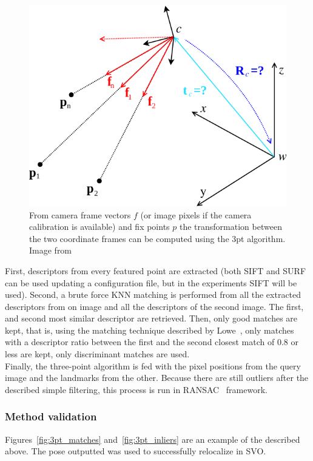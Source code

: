 \begin{figure}[htpb]
  \centering
  \includegraphics[width=0.6\linewidth]{img/absolute_central.png}
  \caption{From camera frame vectors $f$ (or image pixels if the camera calibration is available) and fix points $p$ the transformation between the two coordinate frames can be computed using the 3pt algorithm. Image from \cite{kneipopengv}}
  \label{fig:img/absolute_centra}
\end{figure}

First, descriptors from every featured point are extracted (both SIFT and SURF can be used updating a configuration file, but in the experiments SIFT will be used). Second, a brute force KNN matching is performed from all the extracted descriptors from on image and all the descriptors of the second image. The first, and second most similar descriptor are retrieved. Then, only good matches are kept, that is, using the matching technique described by Lowe~\cite{lowe2004distinctive}, only matches with a descriptor ratio between the first and the second closest match of 0.8 or less are kept, only discriminant matches are used.\\

Finally, the three-point algorithm is fed with the pixel positions from the query image and the landmarks from the other. Because there are still outliers after the described simple filtering, this process is run in RANSAC~\cite{fischler1981random} framework. \\


\subsubsection{Method validation}
\label{ssub:3pt_method_validation}

Figures~\ref{fig:3pt_matches} and~\ref{fig:3pt_inliers} are an example of the described above. The pose outputted was used to successfully relocalize in SVO.\\

